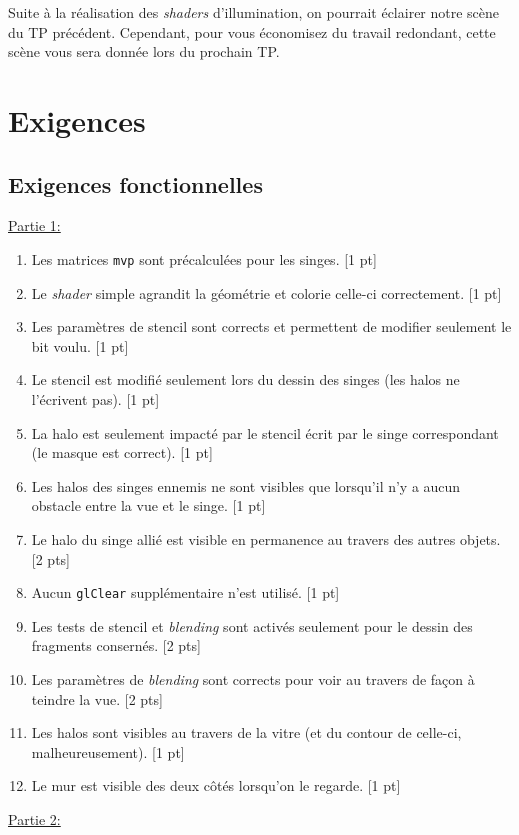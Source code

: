 \documentclass{article}[letterpaper, 11pt]
\begin{document}
Suite à la réalisation des \textit{shaders} d'illumination, on pourrait éclairer notre scène du TP précédent. Cependant, pour vous économisez du travail redondant, cette scène vous sera donnée lors du prochain TP.\@

\newpage
\section{Exigences}
\subsection{Exigences fonctionnelles}
\underline{Partie 1:}
\begin{enumerate}[label={E\arabic*.}]
	\item  Les matrices \texttt{mvp} sont précalculées pour les singes. [1 pt]
	\item Le \textit{shader} simple agrandit la géométrie et colorie celle-ci correctement. [1 pt]
	\item Les paramètres de stencil sont corrects et permettent de modifier seulement le bit voulu. [1 pt]
	\item Le stencil est modifié seulement lors du dessin des singes (les halos ne l'écrivent pas). [1 pt]
	\item La halo est seulement impacté par le stencil écrit par le singe correspondant (le masque est correct). [1 pt]
	\item Les halos des singes ennemis ne sont visibles que lorsqu'il n'y a aucun obstacle entre la vue et le singe. [1 pt]
	\item Le halo du singe allié est visible en permanence au travers des autres objets. [2 pts]
	\item Aucun \texttt{glClear} supplémentaire n'est utilisé. [1 pt]
	\item Les tests de stencil et \textit{blending} sont activés seulement pour le dessin des fragments consernés. [2 pts]
	\item Les paramètres de \textit{blending} sont corrects pour voir au travers de façon à teindre la vue. [2 pts]
	\item Les halos sont visibles au travers de la vitre (et du contour de celle-ci, malheureusement).
	[1 pt]
	\item Le mur est visible des deux côtés lorsqu'on le regarde. [1 pt]
\end{enumerate}

\underline{Partie 2:}
\end{document}
